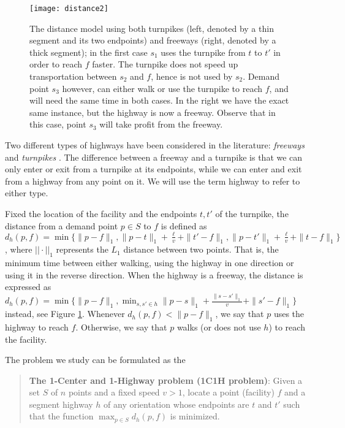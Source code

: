 \documentclass{llncs}
\begin{document}
\begin{figure}[h]
    \centering
    \texttt{[image: distance2]}
    \caption{\small{The distance model using both turnpikes (left, denoted by a thin segment and its two endpoints) and freeways (right, denoted by a thick segment); in the first case $s_1$ uses the turnpike from $t$ to $t'$ in order to reach $f$ faster. The turnpike does not speed up transportation between $s_2$ and $f$, hence is not used by $s_2$. Demand point $s_3$ however, can either walk or use the turnpike to reach $f$, and will need the same time in both cases. In the right we have the exact same instance, but the highway is now a freeway. Observe that in this case, point $s_3$ will take profit from the freeway.}}
\label{fig:distance}
\end{figure}

Two different types of highways have been considered in the literature: {\em freeways} \cite{aap-qpsscvd-04,kt-oishcm-08} and {\em turnpikes} \cite{cardinal08,bae09}. The difference between a freeway and a turnpike is that we can only enter or exit from a turnpike at its endpoints, while we can enter and exit from a highway from any point on it. We will use the term highway to refer to either type.

Fixed the location of the facility and the endpoints $t,t'$ of the turnpike, the distance from a demand point $p\in S$ to $f$ is defined as $d_h(p,f)=\min\{\|p-f\|_1,\|p-t\|_1+\frac{\ell}{v}+\|t'-f\|_1, \|p-t'\|_1+\frac{\ell}{v}+\|t-f\|_1\}$, where $||\cdot||_1$ represents the $L_1$ distance between two points. That is, the minimum time between either walking, using the highway in one direction or using it in the reverse direction. When the highway is a freeway, the distance is expressed as $d_h(p,f)=\min\{\|p-f\|_1,\min_{s,s'\in h} \|p-s\|_1+\frac{\|s-s'\|_1}{v}+\|s'-f\|_1\}$ instead, see Figure \ref{fig:distance}. Whenever $d_h(p,f)<\|p-f\|_1$, we say that $p$ uses the highway to reach $f$. Otherwise, we say that $p$ walks (or does not use $h$) to reach the facility.



The problem we study can be formulated as the 
\begin{quote}
{\bf The 1-Center and 1-Highway problem (1C1H problem)}: Given a set $S$ of $n$ points and a fixed speed $v>1$, locate a point (facility) $f$ and a segment highway $h$ of any orientation whose endpoints are $t$ and $t'$ such that the function $\max_{p\in S}d_{h}(p,f)$ is minimized.
\end{quote}
\end{document}
